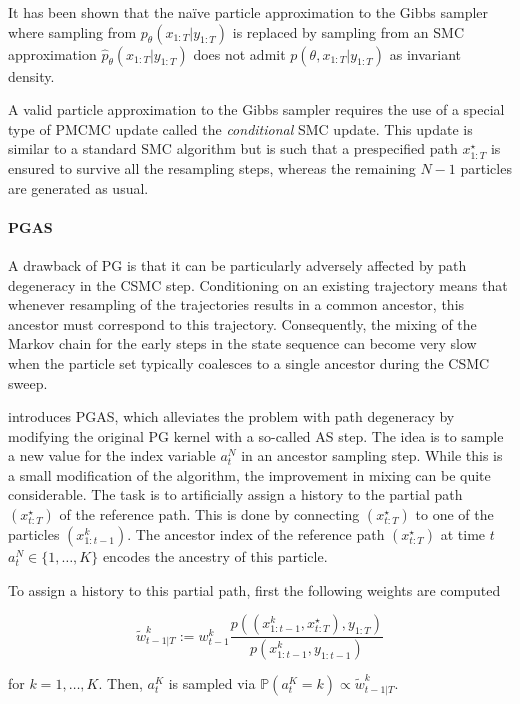 It has been shown \cite{Andrieu:2010gc} that the naïve particle approximation to the Gibbs sampler where sampling from $p_\theta(x_{1:T}|y_{1:T})$ is replaced by sampling from an SMC approximation $\hat{p}_\theta(x_{1:T}|y_{1:T})$ does not admit $p(\theta, x_{1:T}|y_{1:T})$ as invariant density.

A valid particle approximation to the Gibbs sampler requires the use of a special type of \gls{PMCMC} update called the \textit{conditional} \gls{SMC} update. This update is similar to a standard \gls{SMC} algorithm but is such that a prespecified path $x^\star_{1:T}$ is ensured to survive all the resampling steps, whereas the remaining $N-1$ particles are generated as usual.

\paragraph{\gls{PGAS}}
A drawback of \gls{PG} is that it can be particularly adversely affected by path degeneracy in the \gls{CSMC} step. Conditioning on an existing trajectory means that whenever resampling of the trajectories results in a common ancestor, this ancestor must correspond to this trajectory. Consequently, the mixing of the Markov chain for the early steps in the state sequence can become very slow when the particle set typically coalesces to a single ancestor during the \gls{CSMC} sweep.

\cite{Lindsten:2014uw} introduces \gls{PGAS}, which alleviates the problem with path degeneracy by modifying the original \gls{PG} kernel with a so-called \gls{AS} step.
The idea is to sample a new value for the index variable $a_t^N$ in an ancestor sampling step. While this is a small modification of the algorithm, the improvement in mixing can be quite considerable.
The task is to artificially assign a history to the partial path $(x^\star_{t:T})$ of the reference path.
This is done by connecting $(x^\star_{t:T})$ to one of the particles $(x^k_{1:t-1})$.
The ancestor index of the reference path $(x^\star_{t:T})$ at time $t$ $a^N_t \in \{1,\dots,K \}$ encodes the ancestry of this particle.

To assign a history to this partial path, first the following weights are computed

$$ \tilde{w}^k_{t-1|T} := {w}^k_{t-1} \frac{p((x^k_{1:t-1},x^\star_{t:T}), y_{1:T})}{p(x^k_{1:t-1}, y_{1:t-1    })}  $$

for $k = 1,\dots,K$. Then, $a^K_t$ is sampled via $\mathbb{P}\left( a^K_t = k \right) \propto \tilde{w}^k_{t-1|T}$.

